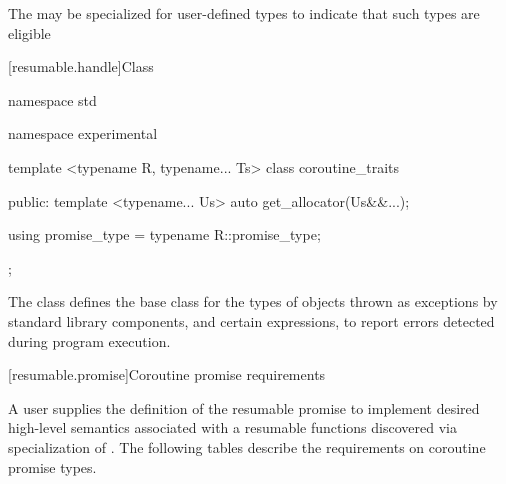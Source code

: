 \pnum
The  may be specialized for user-defined types 
to indicate that such types are eligible


[resumable.handle]{Class }

%
\begin{codeblock}
namespace std {
namespace experimental {
  template <typename R, typename... Ts>
  class coroutine_traits {
  public:
    template <typename... Us>
    auto get_allocator(Us&&...);
				
    using promise_type = typename R::promise_type;
  };
}
}
\end{codeblock}

\pnum
The class
defines the base
class for the types of objects thrown as exceptions by
\Cpp standard library components, and certain
expressions, to report errors detected during program execution.

[resumable.promise]{Coroutine promise requirements}

\pnum
A user supplies the definition of the resumable promise to implement 
desired high-level semantics associated with a resumable functions
discovered via specialization of .
The following tables describe the requirements on
coroutine promise types.


